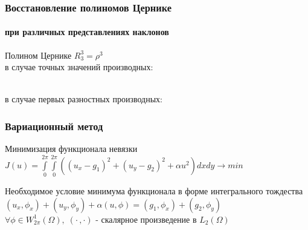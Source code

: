 \documentclass[11pt]{beamer}
\begin{document}
\begin{frame}
\frametitle{Восстановление полиномов Цернике}
\framesubtitle{при различных представлениях наклонов}
Полином Цернике $R_3^3=\rho^3 $ 
\\в случае точных значений производных:
\begin{minipage}[h]{1\linewidth}
\end{minipage}
\\в случае первых разностных производных:
\begin{minipage}[h]{1\linewidth}
\end{minipage}
\end{frame}

\begin{frame}
\frametitle{Вариационный метод}

\begin{block}{Минимизация функционала невязки}
$J(u) = \int \limits_0^{2\pi} \int \limits_0^{2\pi} ((u_x - g_1)^2 + (u_y-g_2)^2 + \alpha u^2 )dxdy \rightarrow min$
\end{block}
\begin{block}{Необходимое условие минимума функционала в форме интегрального тождества}
$(u_x, \phi_x) + (u_y,\phi_y) + \alpha(u, \phi) = (g_1, \phi_x) + (g_2, \phi_y)$\\$\forall\phi \in W_{2\pi}^{1}(\Omega),\;(\cdot\,,\cdot)$ - скалярное произведение в $L_2(\Omega)$
\end{block}
\end{frame}
\end{document}
